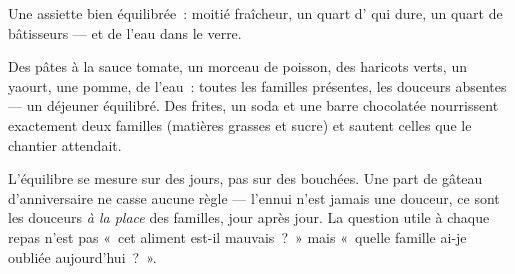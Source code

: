 \begin{omfigure}

{\small Une assiette bien équilibrée~: moitié fraîcheur, un quart
d' qui dure, un quart de bâtisseurs --- et de l'eau dans le
verre.}
\end{omfigure}

\begin{example}\label{ex:g3:balanced-diet:lunch}
Des pâtes à la sauce tomate, un morceau de poisson, des haricots
verts, un yaourt, une pomme, de l'eau~: toutes les familles
présentes, les douceurs absentes --- un déjeuner équilibré. Des
frites, un soda et une barre chocolatée nourrissent exactement deux
familles (matières grasses et sucre) et sautent celles que le
chantier attendait.
\end{example}

\begin{remark}\label{rem:g3:balanced-diet:balance}
L'équilibre se mesure sur des jours, pas sur des bouchées. Une part
de gâteau d'anniversaire ne casse aucune règle --- l'ennui n'est
jamais une douceur, ce sont les douceurs \emph{à la place} des
familles, jour après jour. La question utile à chaque repas n'est
pas «~cet aliment est-il mauvais~?~» mais «~quelle famille ai-je
oubliée aujourd'hui~?~».
\end{remark}

